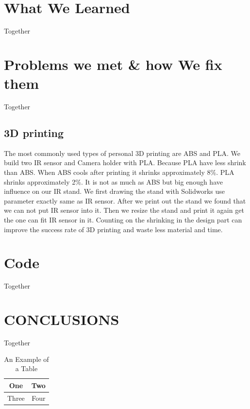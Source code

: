 \documentclass[a4paper, 10pt, conference]{ieeeconf}      %
\begin{document}
\section{What We Learned}

Together

\section{Problems we met & how We fix them}

Together
\subsection{3D printing}
The most commonly used types of personal 3D printing are ABS and PLA. We build two IR sensor and Camera holder with PLA. Because PLA have less shrink than ABS. When ABS cools after printing it shrinks approximately 8\%. PLA shrinks approximately 2\%. It is not as much as ABS but big enough have influence on our IR stand. We first drawing the stand with Solidworks use parameter exactly same as IR sensor. After we print out the stand we found that we can not put IR sensor into it. Then we resize the stand and print it again get the one can fit IR sensor in it. Counting on the shrinking in the design part can improve the success rate of 3D printing and waste less material and time.
\section{Code}

Together

\section{CONCLUSIONS}

Together


\begin{table}[h]
\caption{An Example of a Table}
\label{table_example}
\begin{center}
\begin{tabular}{|c||c|}
\hline
One & Two\\
\hline
Three & Four\\
\hline
\end{tabular}
\end{center}
\end{table}
\end{document}
